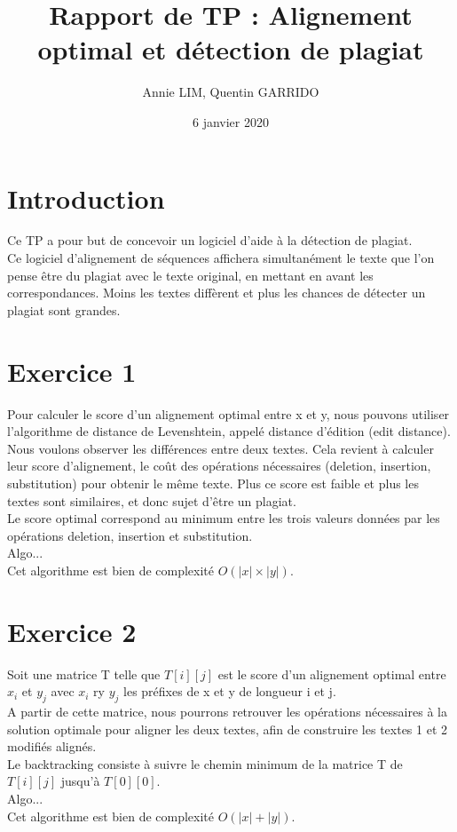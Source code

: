 \documentclass{article}
\title{Rapport de TP : Alignement optimal et détection de plagiat}
\author{Annie LIM, Quentin GARRIDO}
\date{6 janvier 2020}
\begin{document}
\maketitle
\tableofcontents
\pagebreak

\section{Introduction}

Ce TP a pour but de concevoir un logiciel d'aide à la détection de plagiat.\\
Ce logiciel d'alignement de séquences affichera simultanément le texte que l'on pense être du plagiat avec le texte original, en mettant en avant les correspondances. Moins les textes diffèrent et plus les chances de détecter un plagiat sont grandes.\\

\section{Exercice 1}

Pour calculer le score d'un alignement optimal entre x et y, nous pouvons utiliser l'algorithme de distance de Levenshtein, appelé distance d'édition (edit distance).\\
Nous voulons observer les différences entre deux textes. Cela revient à calculer leur score d'alignement, le coût des opérations nécessaires (deletion, insertion, substitution) pour obtenir le même texte. Plus ce score est faible et plus les textes sont similaires, et donc sujet d'être un plagiat.\\
Le score optimal correspond au minimum entre les trois valeurs données par les opérations deletion, insertion et substitution. \\
Algo...\\
Cet algorithme est bien de complexité $O(\lvert x\rvert \times \lvert y\rvert)$.


\section{Exercice 2}

Soit une matrice T telle que $T[i][j]$ est le score d'un alignement optimal entre $x_{i}$ et $y_{j}$ avec $x_{i}$ ry $y_{j}$ les préfixes de x et y de longueur i et j.\\
A partir de cette matrice, nous pourrons retrouver les opérations nécessaires à la solution optimale pour aligner les deux textes, afin de construire les textes 1 et 2 modifiés alignés.\\
Le backtracking consiste à suivre le chemin minimum de la matrice T de
$T[i][j]$ jusqu'à $T[0][0]$.\\
Algo...\\
Cet algorithme est bien de complexité $O(\lvert x\rvert+\lvert y\rvert)$.
\end{document}
